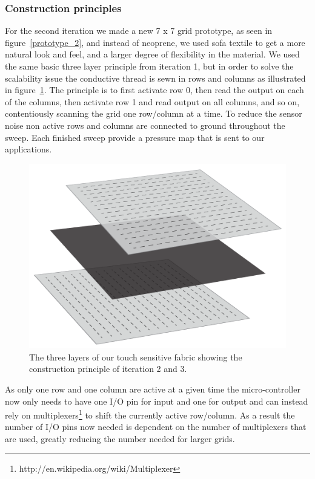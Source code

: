 \subsubsection{Construction principles}
For the second iteration we made a new 7 x 7 grid prototype, as seen in figure~\ref{prototype_2}, and instead of neoprene, we used sofa textile to get a more natural look and feel, and a larger degree of flexibility in the material.
We used the same basic three layer principle from iteration 1, but in order to solve the scalability issue the conductive thread is sewn in rows and columns as illustrated in figure~\ref{layers_iteration2_and_3}.
The principle is to first activate row 0, then read the output on each of the columns, then activate row 1 and read output on all columns, and so on, contentiously scanning the grid one row/column at a time.
To reduce the sensor noise non active rows and columns are connected to ground throughout the sweep.
Each finished sweep provide a pressure map that is sent to our applications.

\begin{figure}[h]
  \centering
  \begin{minipage}[b]{.8\textwidth}
    \centering
    \includegraphics[width=.7\linewidth]{figures/touch/layers_it_23}
	\caption[The three layers of our touch sensitive fabric, iteration 2 and 3.]
   {The three layers of our touch sensitive fabric showing the construction principle of iteration 2 and 3.}
   \label{layers_iteration2_and_3}
   \end{minipage}
\end{figure}

As only one row and one column are active at a given time the micro-controller now only needs to have one I/O pin for input and one for output and can instead rely on multiplexers\footnote{http://en.wikipedia.org/wiki/Multiplexer} to shift the currently active row/column.
As a result the number of I/O pins now needed is dependent on the number of multiplexers that are used, greatly reducing the number needed for larger grids.

